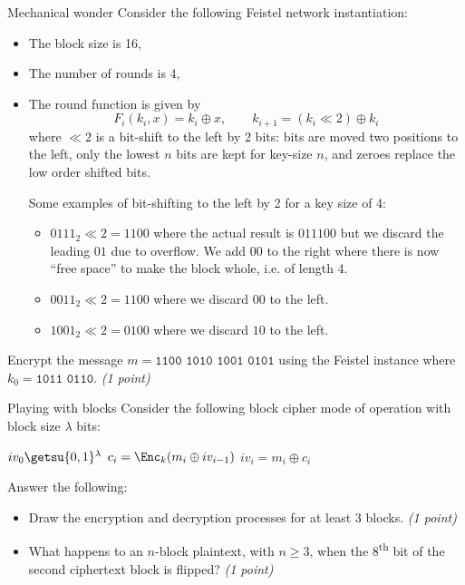 \documentclass{homework}
\begin{document}
\begin{task}{Mechanical wonder}
  Consider the following Feistel network instantiation:
  \begin{itemize}
    \item The block size is 16,
    \item The number of rounds is 4,
    \item The round function is given by
    \[
      F_i(k_i, x) = k_i \oplus x,\qquad k_{i+1} = (k_i \ll 2) \oplus k_i
    \]
    where $\ll 2$ is a bit-shift to the left by 2 bits: bits are moved two positions to the left, only the lowest $n$ bits are kept for key-size $n$, and zeroes replace the low order shifted bits.

    Some examples of bit-shifting to the left by 2 for a key size of 4:
    \begin{itemize}
      \item $0111_2 \ll 2 = 1100$ where the actual result is $011100$ but we discard the leading $01$ due to overflow.
      We add $00$ to the right where there is now \enquote{free space} to make the block whole, i.e. of length 4.
      \item $0011_2 \ll 2 = 1100$ where we discard $00$ to the left.
      \item $1001_2 \ll 2 = 0100$ where we discard $10$ to the left.
    \end{itemize}
  \end{itemize}

  Encrypt the message $m=\texttt{1100 1010 1001 0101}$ using the Feistel instance where $k_0=\texttt{1011 0110}$.
  \textit{(1 point)}
\end{task}

\begin{task}{Playing with blocks}
  Consider the following block cipher mode of operation with block size $\lambda$ bits:
  \begin{algorithmic}[1]
    \State $iv_0 \getsu \{0,1\}^\lambda$
      \State $c_i = \Enc_k(m_i \oplus iv_{i-1})$
      \State $iv_i = m_i \oplus c_i$
    \EndFor
    \State{}
    \EndProcedure
  \end{algorithmic}

  Answer the following:
  \begin{itemize}
    \item Draw the encryption and decryption processes for at least 3 blocks.
    \textit{(1 point)}
    \item What happens to an $n$-block plaintext, with $n \ge 3$, when the 8\textsuperscript{th} bit of the second ciphertext block is flipped?
    \textit{(1 point)}
  \end{itemize}
\end{task}
\end{document}
